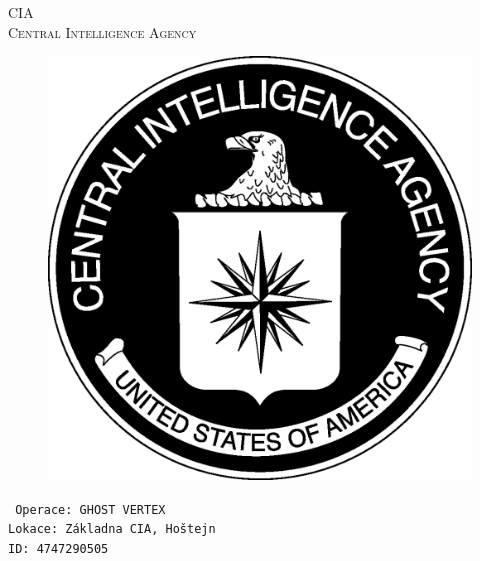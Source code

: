 \documentclass[a4paper, \fontheight]{article}
\begin{document}
	\begin{titlepage}
		\begin{center}		
			\textsc{{\fontsize{80}{0}\selectfont CIA}\\[2em]
				\Huge Central Intelligence Agency\\[2.5em]}
				
			\begin{figure}[H]
				\centering
				\includegraphics[scale=0.6]{sources/CIA_logo.eps}
			\end{figure}
		\end{center}	
		\vfill
		\noindent
		\texttt{\LARGE
				Operace: GHOST VERTEX\\[0.4em]
				Lokace: Základna CIA, Hoštejn\\[0.4em]
				ID: 4747290505}	
\end{titlepage} 
\end{document}
